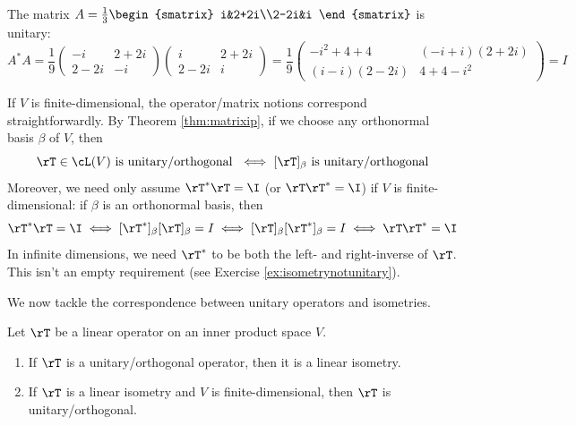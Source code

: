 \begin{example}{}{}
The matrix $A=\frac 13\begin{smatrix}
i&2+2i\\2-2i&i
\end{smatrix}$ is unitary:
\[A^*A=\frac 19\begin{pmatrix}
-i&2+2i\\2-2i&-i
\end{pmatrix}\begin{pmatrix}
i&2+2i\\2-2i&i
\end{pmatrix}
=\frac 19\begin{pmatrix}
-i^2+4+4&(-i+i)(2+2i)\\(i-i)(2-2i)&4+4-i^2
\end{pmatrix}
=I\]
\end{example}

If $V$ is finite-dimensional, the operator/matrix notions correspond straightforwardly. By Theorem \ref{thm:matrixip}, if we choose any orthonormal basis $\beta$ of $V$, then
\[\rT\in\cL(V)\text{ is unitary/orthogonal } \iff [\rT]_\beta \text{ is unitary/orthogonal}\]
Moreover, we need only assume $\rT^*\rT=\I$ (or $\rT\rT^*=\I$) if $V$ is finite-dimensional: if $\beta$ is an orthonormal basis, then
\[\rT^*\rT=\I\iff[\rT^*]_\beta[\rT]_\beta=I\iff [\rT]_\beta[\rT^*]_\beta=I\iff \rT\rT^*=\I\]
In infinite dimensions, we need $\rT^*$ to be both the left- and right-inverse of $\rT$. This isn't an empty requirement (see Exercise \ref{ex:isometrynotunitary}).


\goodbreak

We now tackle the correspondence between unitary operators and isometries.

\begin{thm}{}{}
Let $\rT$ be a linear operator on an inner product space $V$.
\begin{enumerate}
  \item If $\rT$ is a unitary/orthogonal operator, then it is a linear isometry.
  \item If $\rT$ is a linear isometry and $V$ is finite-dimensional, then $\rT$ is unitary/orthogonal.
\end{enumerate}
\end{thm}

